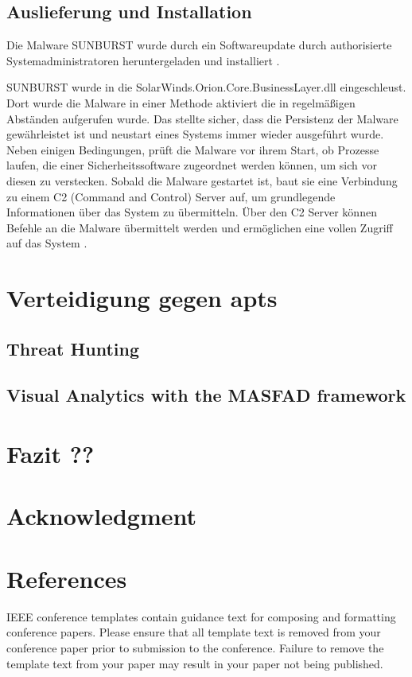 \documentclass[conference]{IEEEtran}
\begin{document}
\subsection{Auslieferung und Installation}
Die Malware SUNBURST wurde durch ein Softwareupdate durch authorisierte Systemadministratoren heruntergeladen und installiert \cite{FIREEYE2020}.

SUNBURST wurde in die SolarWinds.Orion.Core.BusinessLayer.dll eingeschleust.
Dort wurde die Malware in einer Methode aktiviert die in regelmäßigen Abständen aufgerufen wurde.
Das stellte sicher, dass die Persistenz der Malware gewährleistet ist und neustart eines Systems immer wieder ausgeführt wurde.
Neben einigen Bedingungen, prüft die Malware vor ihrem Start, ob Prozesse laufen, die einer Sicherheitssoftware zugeordnet werden können, um sich vor diesen zu verstecken.
Sobald die Malware gestartet ist, baut sie eine Verbindung zu einem C2 (Command and Control) Server auf, um grundlegende Informationen über das System zu übermitteln.
Über den C2 Server können Befehle an die Malware übermittelt werden und ermöglichen eine vollen Zugriff auf das System \cite{Intelligence2020}.



\section{Verteidigung gegen \aclp{apt}}
\subsection{Threat Hunting}
\subsection{Visual Analytics with the MASFAD framework}
\section{Fazit ??}

\section*{Acknowledgment}

\section*{References}

\balance





\vspace{12pt}
\color{red}
IEEE conference templates contain guidance text for composing and formatting conference papers. Please ensure that all template text is removed from your conference paper prior to submission to the conference. Failure to remove the template text from your paper may result in your paper not being published.
\end{document}
